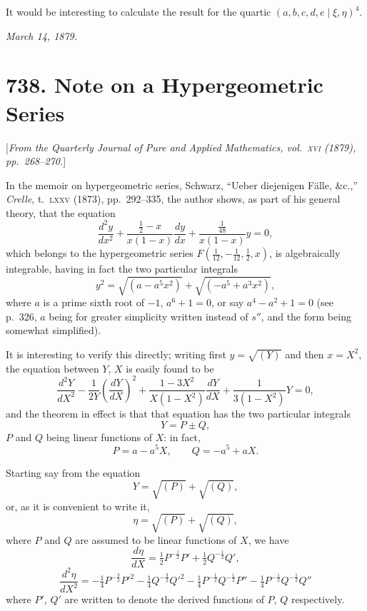 \documentclass[12pt,a4paper]{article}
\theoremstyle{plain}
\begin{document}
It would be interesting to calculate the result for the quartic
$(a,b,c,d,e\mid\xi,\eta)^4$.

\textit{March 14, 1879.}

\newpage
\section*{738. Note on a Hypergeometric Series}

[\textit{From the Quarterly Journal of Pure and Applied Mathematics, vol.~\textsc{xvi} (1879),
pp.~268--270.}]

In the memoir on hypergeometric series, Schwarz, ``Ueber diejenigen
F\"alle, \&c.,'' \textit{Crelle}, t.~\textsc{lxxv} (1873), pp.~292--335, the author shows, as part
of his general theory, that the equation
\[
\frac{d^2y}{dx^2}
+ \frac{\frac{1}{2} - x}{x(1-x)}\frac{dy}{dx}
+ \frac{\frac{1}{48}}{x(1-x)}y = 0,
\]
which belongs to the hypergeometric series
$F(\tfrac{1}{12},-\tfrac{1}{12},\tfrac{1}{2},x)$, is algebraically integrable,
having in fact the two particular integrals
\[
y^2 = \sqrt{(a-a^5x^2)} + \sqrt{(-a^5+a^3x^2)},
\]
where $a$ is a prime sixth root of $-1$, $a^6+1=0$, or say $a^4-a^2+1=0$
(see p.~326, $a$ being for greater simplicity written instead of $s''$, and the
form being somewhat simplified).

It is interesting to verify this directly; writing first $y=\sqrt{(Y)}$
and then $x=X^2$, the equation between $Y$, $X$ is easily found to be
\[
\frac{d^2Y}{dX^2}
- \frac{1}{2Y}\left(\frac{dY}{dX}\right)^2
+ \frac{1-3X^2}{X(1-X^2)}\frac{dY}{dX}
+ \frac{1}{3(1-X^2)}Y = 0,
\]
and the theorem in effect is that that equation has the two particular integrals
\[
Y = P \pm Q,
\]
$P$ and $Q$ being linear functions of $X$: in fact,
\[
P = a - a^5X,\qquad Q = -a^5 + aX.
\]

Starting say from the equation
\[
Y = \sqrt{(P)} + \sqrt{(Q)},
\]
or, as it is convenient to write it,
\[
\eta = \sqrt{(P)} + \sqrt{(Q)},
\]
where $P$ and $Q$ are assumed to be linear functions of $X$, we have
\[
\frac{d\eta}{dX} = \tfrac{1}{2}P^{-\frac{1}{2}}P' + \tfrac{1}{2}Q^{-\frac{1}{2}}Q',
\]
\[
\frac{d^2\eta}{dX^2}
= -\tfrac{1}{4}P^{-\frac{3}{2}}P'^2 - \tfrac{1}{4}Q^{-\frac{3}{2}}Q'^2
- \tfrac{1}{4}P^{-\frac{1}{2}}Q^{-\frac{1}{2}}P''
- \tfrac{1}{4}P^{-\frac{1}{2}}Q^{-\frac{1}{2}}Q''
\]
where $P'$, $Q'$ are written to denote the derived functions of $P$, $Q$ respectively.
\end{document}
